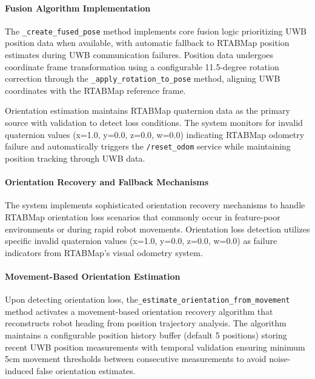 \paragraph{Fusion Algorithm Implementation}

The \texttt{\_create\_fused\_pose} method implements core fusion logic prioritizing UWB position data when available, with automatic fallback to RTABMap position estimates during UWB communication failures. Position data undergoes coordinate frame transformation using a configurable 11.5-degree rotation correction through the \texttt{\_apply\_rotation\_to\_pose} method, aligning UWB coordinates with the RTABMap reference frame.

Orientation estimation maintains RTABMap quaternion data as the primary source with validation to detect loss conditions. The system monitors for invalid quaternion values (x=1.0, y=0.0, z=0.0, w=0.0) indicating RTABMap odometry failure and automatically triggers the \texttt{/reset\_odom} service while maintaining position tracking through UWB data.

\paragraph{Orientation Recovery and Fallback Mechanisms}

The system implements sophisticated orientation recovery mechanisms to handle RTABMap orientation loss scenarios that commonly occur in feature-poor environments or during rapid robot movements. Orientation loss detection utilizes specific invalid quaternion values (x=1.0, y=0.0, z=0.0, w=0.0) as failure indicators from RTABMap's visual odometry system.

\paragraph{Movement-Based Orientation Estimation}

Upon detecting orientation loss, the\linebreak\texttt{\_estimate\_orientation\_from\_movement} method activates a movement-based orientation recovery algorithm that reconstructs robot heading from position trajectory analysis. The algorithm maintains a configurable position history buffer (default 5 positions) storing recent UWB position measurements with temporal validation ensuring minimum 5cm movement thresholds between consecutive measurements to avoid noise-induced false orientation estimates.

